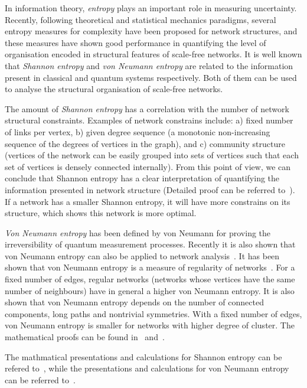 In information theory, \emph{entropy} plays an important role in measuring uncertainty. Recently, following theoretical and statistical mechanics paradigms, several entropy measures for complexity have been proposed for network structures, and these measures have shown good performance in quantifying the level of organisation encoded in structural features of scale-free networks. It is well known that \emph{Shannon entropy} and \emph{von Neumann entropy} are related to the information present in classical and quantum systems respectively. Both of them can be used to analyse the structural organisation of scale-free networks\cite{anand2009entropy}. 

The amount of \emph{Shannon entropy} has a correlation with the number of network structural constraints. Examples of network constrains include: a) fixed number of links per vertex, b) given degree sequence (a monotonic non-increasing sequence of the degrees of vertices in the graph), and c) community structure (vertices of the network can be easily grouped into sets of vertices such that each set of vertices is densely connected internally). From this point of view, we can conclude that Shannon entropy has a clear interpretation of quantifying the information presented in network structure (Detailed proof can be referred to~\cite{anand2009entropy}). If a network has a smaller Shannon entropy, it will have more constrains on its structure, which shows this network is more optimal. 

\emph{Von Neumann entropy} has been defined by von Neumann for proving the irreversibility of quantum measurement processes. Recently it is also shown that von Neumann entropy can also be applied to network analysis~\cite{passerini2008neumann}. It has been shown that von Neumann entropy is a measure of regularity of networks~\cite{passerini2008neumann}. For a fixed number of edges, regular networks (networks whose vertices have the same number of neighbours) have in general a higher von Neumann entropy. It is also shown that von Neumann entropy depends on the number of connected components, long paths and nontrivial symmetries. With a fixed number of edges, von Neumann entropy is smaller for networks with higher degree of cluster. The mathematical proofs can be found in~\cite{passerini2008neumann} and~\cite{anand2009entropy}.

The mathmatical presentations and calculations for Shannon entropy can be refered to~\cite{lin1991divergence}, while the presentations and calculations for von Neumann entropy can be referred to~\cite{passerini2008neumann}.

